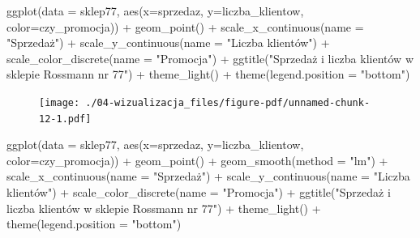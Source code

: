 \documentclass[
  letterpaper,
  DIV=11,
  numbers=noendperiod]{scrreprt}
\newenvironment{Shaded}{\begin{snugshade}}{\end{snugshade}}
\newcommand{\AttributeTok}[1]{\textcolor[rgb]{0.40,0.45,0.13}{#1}}
\newcommand{\FunctionTok}[1]{\textcolor[rgb]{0.28,0.35,0.67}{#1}}
\newcommand{\NormalTok}[1]{\textcolor[rgb]{0.00,0.23,0.31}{#1}}
\newcommand{\SpecialCharTok}[1]{\textcolor[rgb]{0.37,0.37,0.37}{#1}}
\newcommand{\StringTok}[1]{\textcolor[rgb]{0.13,0.47,0.30}{#1}}
\begin{document}
\begin{Shaded}
\begin{Highlighting}[]
\FunctionTok{ggplot}\NormalTok{(}\AttributeTok{data =}\NormalTok{ sklep77, }\FunctionTok{aes}\NormalTok{(}\AttributeTok{x=}\NormalTok{sprzedaz, }\AttributeTok{y=}\NormalTok{liczba\_klientow, }\AttributeTok{color=}\NormalTok{czy\_promocja)) }\SpecialCharTok{+}
  \FunctionTok{geom\_point}\NormalTok{() }\SpecialCharTok{+}
  \FunctionTok{scale\_x\_continuous}\NormalTok{(}\AttributeTok{name =} \StringTok{"Sprzedaż"}\NormalTok{) }\SpecialCharTok{+}
  \FunctionTok{scale\_y\_continuous}\NormalTok{(}\AttributeTok{name =} \StringTok{"Liczba klientów"}\NormalTok{) }\SpecialCharTok{+}
  \FunctionTok{scale\_color\_discrete}\NormalTok{(}\AttributeTok{name =} \StringTok{"Promocja"}\NormalTok{) }\SpecialCharTok{+}
  \FunctionTok{ggtitle}\NormalTok{(}\StringTok{"Sprzedaż i liczba klientów w sklepie Rossmann nr 77"}\NormalTok{) }\SpecialCharTok{+}
  \FunctionTok{theme\_light}\NormalTok{() }\SpecialCharTok{+}
  \FunctionTok{theme}\NormalTok{(}\AttributeTok{legend.position =} \StringTok{"bottom"}\NormalTok{)}
\end{Highlighting}
\end{Shaded}

\begin{figure}[H]

{\centering \texttt{[image: ./04-wizualizacja\_files/figure-pdf/unnamed-chunk-12-1.pdf]}

}

\end{figure}

\begin{Shaded}
\begin{Highlighting}[]
\FunctionTok{ggplot}\NormalTok{(}\AttributeTok{data =}\NormalTok{ sklep77, }\FunctionTok{aes}\NormalTok{(}\AttributeTok{x=}\NormalTok{sprzedaz, }\AttributeTok{y=}\NormalTok{liczba\_klientow, }\AttributeTok{color=}\NormalTok{czy\_promocja)) }\SpecialCharTok{+}
  \FunctionTok{geom\_point}\NormalTok{() }\SpecialCharTok{+}
  \FunctionTok{geom\_smooth}\NormalTok{(}\AttributeTok{method =} \StringTok{"lm"}\NormalTok{) }\SpecialCharTok{+}
  \FunctionTok{scale\_x\_continuous}\NormalTok{(}\AttributeTok{name =} \StringTok{"Sprzedaż"}\NormalTok{) }\SpecialCharTok{+}
  \FunctionTok{scale\_y\_continuous}\NormalTok{(}\AttributeTok{name =} \StringTok{"Liczba klientów"}\NormalTok{) }\SpecialCharTok{+}
  \FunctionTok{scale\_color\_discrete}\NormalTok{(}\AttributeTok{name =} \StringTok{"Promocja"}\NormalTok{) }\SpecialCharTok{+}
  \FunctionTok{ggtitle}\NormalTok{(}\StringTok{"Sprzedaż i liczba klientów w sklepie Rossmann nr 77"}\NormalTok{) }\SpecialCharTok{+}
  \FunctionTok{theme\_light}\NormalTok{() }\SpecialCharTok{+}
  \FunctionTok{theme}\NormalTok{(}\AttributeTok{legend.position =} \StringTok{"bottom"}\NormalTok{)}
\end{Highlighting}
\end{Shaded}
\end{document}
